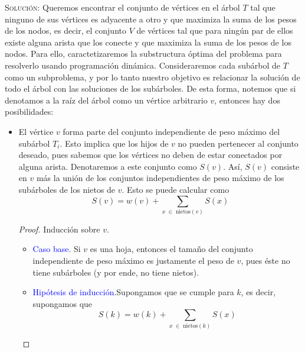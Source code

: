 \documentclass[letterpaper,11pt]{article}
\begin{document}
\begin{enumerate}
    \textsc{Solución:} Queremos encontrar el conjunto de vértices en el árbol 
    $T$ tal que ninguno de sus vértices es adyacente a otro y que maximiza la 
    suma de los pesos de los nodos, es decir, el conjunto $V$ de vértices tal 
    que para ningún par de ellos existe alguna arista que los conecte y que 
    maximiza la suma de los pesos de los nodos. Para ello, caractetizaremos la 
    substructura óptima del problema para resolverlo usando programación 
    dinámica. Consideraremos cada subárbol de $T$ como un subproblema, y por 
    lo tanto nuestro objetivo es relacionar la solución de todo el árbol con 
    las soluciones de los subárboles. De esta forma, notemos que si denotamos 
    a la raíz del árbol como un vértice arbitrario $v$, entonces hay dos 
    posibilidades:
    \begin{itemize}
        \item El vértice $v$ forma parte del conjunto independiente de peso 
        máximo del subárbol $T_i$. Esto implica que los hijos de $v$ no pueden
        pertenecer al conjunto deseado, pues sabemos que los vértices no deben 
        de estar conectados por alguna arista. Denotaremos a este conjunto como 
        $S(v)$. Así, $S(v)$ consiste en $v$ más la unión de los conjuntos 
        independientes de peso máximo de los subárboles de los nietos de $v$. 
        Esto se puede calcular como 
        \begin{equation*}
            S(v) = w(v) + \sum_{x \; \in \; \text{nietos}(v)} S(x)
        \end{equation*}

        \begin{proof}
            Inducción sobre $v$.
            \begin{itemize}
                \item \textcolor{blue}{Caso base}. Si $v$ es una hoja, entonces 
                el tamaño del conjunto independiente de peso máximo es justamente 
                el peso de $v$, pues éste no tiene subárboles (y por ende, no 
                tiene nietos).

                \item \textcolor{blue}{Hipótesis de inducción}.Supongamos que se
                cumple para $k$, es decir, supongamos que 
                \begin{equation*}
                    S(k) = w(k) + \sum_{x \; \in \; \text{nietos}(k)} S(x)
                \end{equation*}


\end{itemize}
\end{proof}
\end{itemize}
\end{enumerate}
\end{document}
